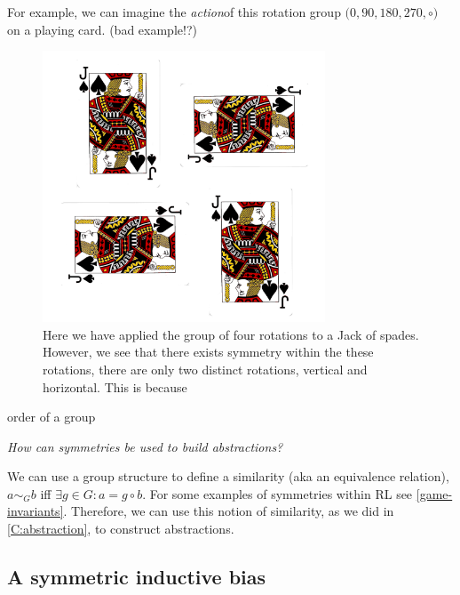 For example, we can imagine the \textit{action}\footnotemark[37] of this rotation group $\big(0, 90, 180, 270, \circ \big)$ on a playing card. (bad example!?)


\begin{figure}[h!]
	\centering
	\includegraphics[width=0.75\textwidth,height=0.5\textheight]{../../pictures/images/jacks.png}
	\caption{Here we have applied the group of four rotations to a Jack of spades.
	However, we see that there exists symmetry within the these rotations,
	there are only two distinct rotations, vertical and horizontal. This is because }
\end{figure}

{\color{red}order of a group}

\begin{displayquote}
\textsl{How can symmetries be used to build abstractions?}
\end{displayquote}

We can use a group structure to define a similarity (aka an equivalence relation),
$a \sim_G b$ iff $\exists g \in G: a = g \circ b$. For some examples of symmetries within RL see \ref{game-invariants}.
Therefore, we can use this notion of similarity, as we did in \ref{C:abstraction}, to construct abstractions.


\subsection{A symmetric inductive bias}

